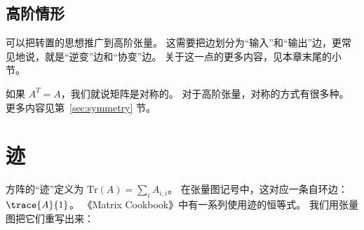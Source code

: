 \subsection{高阶情形}
可以把转置的思想推广到高阶张量。
这需要把边划分为“输入”和“输出”边，更常见地说，就是“逆变”边和“协变”边。
关于这一点的更多内容，见本章末尾的小节。

如果 $A^T = A$，我们就说矩阵是对称的。
对于高阶张量，对称的方式有很多种。
更多内容见第~\ref{sec:symmetry} 节。

\section{迹}

方阵的“迹”定义为 $\mathrm{Tr}(A) = \sum_i A_{i,i}$。
在张量图记号中，这对应一条自环边：$\trace{A}{1}$。
《Matrix Cookbook》中有一系列使用迹的恒等式。
我们用张量图把它们重写出来：
